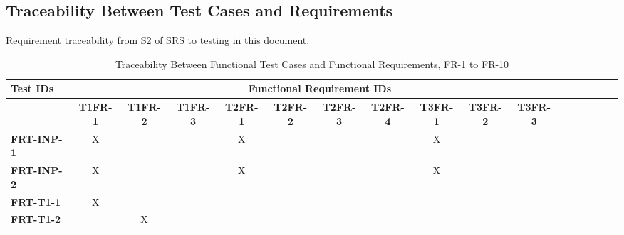 \documentclass[12pt, titlepage]{article}
\begin{document}
\begin{landscape}

		\subsection{Traceability Between Test Cases and Requirements}

		Requirement traceability from S2 of SRS to testing in this document.

		\begin{longtable}{|l|cccccccccccccccc|}
			\caption{Traceability Between Functional Test Cases and Functional Requirements, FR-1 to FR-10}                                                                                                                                                                                                                           \\
			\hline
			\textbf{Test IDs}   & \multicolumn{11}{c|}{\textbf{Functional Requirement IDs}}                                                                                                                                                                                                                                         \\
			\hline
			~                   & \textbf{T1FR-1}                                              & \textbf{T1FR-2} & \textbf{T1FR-3} & \textbf{T2FR-1} & \textbf{T2FR-2} & \textbf{T2FR-3} & \textbf{T2FR-4} & \textbf{T3FR-1} & \textbf{T3FR-2} & \textbf{T3FR-3}  \\
			\hline
   		\textbf{FRT-INP-1}  & X                                                         & ~            & ~            & X            & ~            & ~            & ~            & X            & ~            & ~             \\
        	\textbf{FRT-INP-2}  & X                                                         & ~            & ~            & X            & ~            & ~            & ~            & X            & ~            & ~             \\
          \textbf{FRT-T1-1}  & X                                                         & ~            & ~            & ~            & ~            & ~            & ~            & ~            & ~            & ~             \\
          \textbf{FRT-T1-2}  & ~                                                         & X            & ~            & ~            & ~            & ~            & ~            & ~            & ~            & ~             \\

\end{longtable}
\end{landscape}
\end{document}
